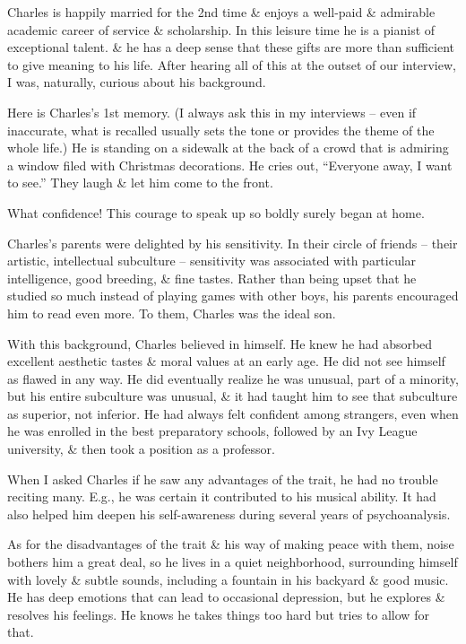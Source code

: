 \documentclass{article}
\numberwithin{equation}{section}
\begin{document}
Charles is happily married for the 2nd time \& enjoys a well-paid \& admirable academic career of service \& scholarship. In this leisure time he is a pianist of exceptional talent. \& he has a deep sense that these gifts are more than sufficient to give meaning to his life. After hearing all of this at the outset of our interview, I was, naturally, curious about his background.

Here is Charles's 1st memory. (I always ask this in my interviews -- even if inaccurate, what is recalled usually sets the tone or provides the theme of the whole life.) He is standing on a sidewalk at the back of a crowd that is admiring a window filed with Christmas decorations. He cries out, ``Everyone away, I want to see.'' They laugh \& let him come to the front.

What confidence! This courage to speak up so boldly surely began at home.

Charles's parents were delighted by his sensitivity. In their circle of friends -- their artistic, intellectual subculture -- sensitivity was associated with particular intelligence, good breeding, \& fine tastes. Rather than being upset that he studied so much instead of playing games with other boys, his parents encouraged him to read even more. To them, Charles was the ideal son.

With this background, Charles believed in himself. He knew he had absorbed excellent aesthetic tastes \& moral values at an early age. He did not see himself as flawed in any way. He did eventually realize he was unusual, part of a minority, but his entire subculture was unusual, \& it had taught him to see that subculture as superior, not inferior. He had always felt confident among strangers, even when he was enrolled in the best preparatory schools, followed by an Ivy League university, \& then took a position as a professor.

When I asked Charles if he saw any advantages of the trait, he had no trouble reciting many. E.g., he was certain it contributed to his musical ability. It had also helped him deepen his self-awareness during several years of psychoanalysis.

As for the disadvantages of the trait \& his way of making peace with them, noise bothers him a great deal, so he lives in a quiet neighborhood, surrounding himself with lovely \& subtle sounds, including a fountain in his backyard \& good music. He has deep emotions that can lead to occasional depression, but he explores \& resolves his feelings. He knows he takes things too hard but tries to allow for that.
\end{document}
